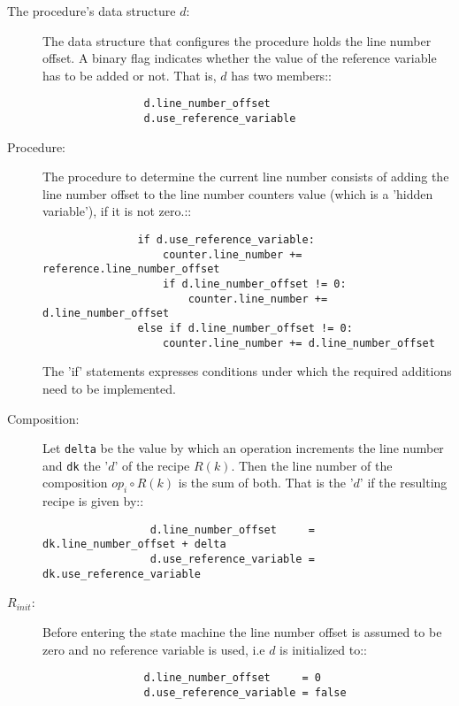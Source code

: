 \documentclass[12pt,a4paper]{scrartcl}
\begin{document}
\begin{description}
    \item[The procedure's data structure $d$:] The data structure that configures
        the procedure holds the line number offset. A binary flag indicates whether
        the value of the reference variable has to be added or not. That is, $d$
        has two members::

        \begin{verbatim}
                d.line_number_offset
                d.use_reference_variable
        \end{verbatim}
        
    \item[Procedure:] The procedure to determine the current line number
        consists of adding the line number offset to the line number
        counters value (which is a 'hidden variable'), if it is not zero.::

        \begin{verbatim}
               if d.use_reference_variable:
                   counter.line_number += reference.line_number_offset 
                   if d.line_number_offset != 0:
                       counter.line_number += d.line_number_offset 
               else if d.line_number_offset != 0:
                   counter.line_number += d.line_number_offset
        \end{verbatim}

        The 'if' statements expresses conditions under which the required
        additions need to be implemented.

   \item[Composition:] Let \verb/delta/ be the value by which an operation increments
       the line number and \verb/dk/ the '$d$' of the recipe $R(k)$.
       Then the line number of the composition $op_i\circ R(k)$ is the sum of
       both. That is the '$d$' if the resulting recipe is given by::

        \begin{verbatim}
                 d.line_number_offset     = dk.line_number_offset + delta
                 d.use_reference_variable = dk.use_reference_variable
        \end{verbatim}

   \item[$R_{init}$:] Before entering the state machine the line number offset
        is assumed to be zero and no reference variable is used, i.e $d$ is
        initialized to::

        \begin{verbatim}
                d.line_number_offset     = 0
                d.use_reference_variable = false
        \end{verbatim}


\end{description}
\end{document}
